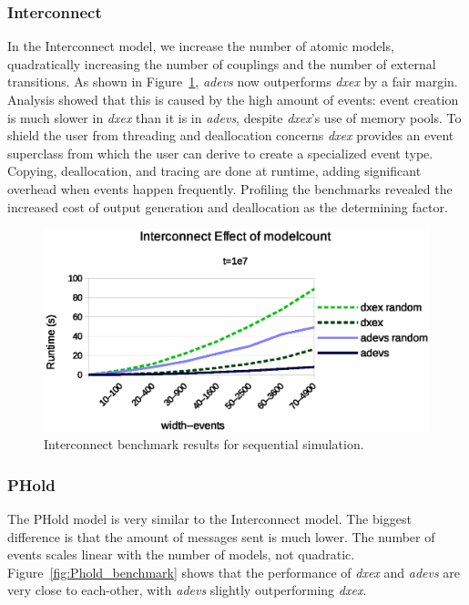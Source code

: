 \subsubsection{Interconnect}
\label{4-seq-Interconnect}
In the Interconnect model, we increase the number of atomic models, quadratically increasing the number of couplings and the number of external transitions.
As shown in Figure~\ref{fig:Interconnect_benchmark}, \textit{adevs} now outperforms \textit{dxex} by a fair margin.
Analysis showed that this is caused by the high amount of events: event creation is much slower in \textit{dxex} than it is in \textit{adevs}, despite \textit{dxex}'s use of memory pools.
To shield the user from threading and deallocation concerns \textit{dxex} provides an event superclass from which the user can derive to create a specialized event type.
Copying, deallocation, and tracing are done at runtime, adding significant overhead when events happen frequently.
Profiling the benchmarks revealed the increased cost of output generation and deallocation as the determining factor.

\begin{figure}
	\center
	\includegraphics[width=\columnwidth]{fig/interconnect_sequential.eps}
	\caption{Interconnect benchmark results for sequential simulation.}
	\label{fig:Interconnect_benchmark}
\end{figure}

\subsubsection{PHold}
\label{4-seq-PHold}
The PHold model is very similar to the Interconnect model.
The biggest difference is that the amount of messages sent is much lower.
The number of events scales linear with the number of models, not quadratic.
Figure~\ref{fig:Phold_benchmark} shows that the performance of \textit{dxex} and \textit{adevs} are very close to each-other, with \textit{adevs} slightly outperforming \textit{dxex}.

